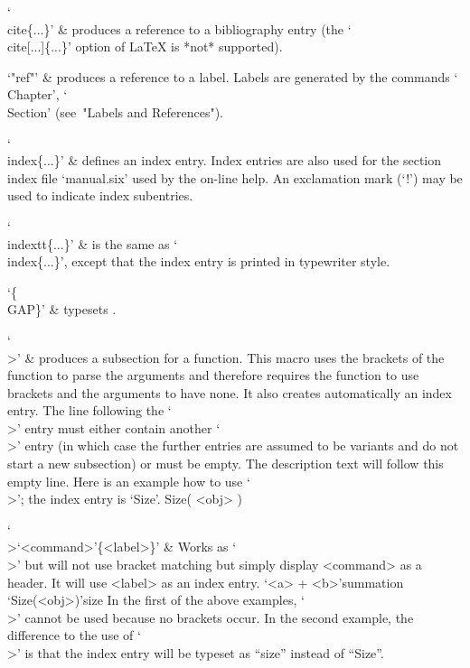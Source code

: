 `\\cite\{...\}' &
    produces  a     reference     to    a    bibliography   entry    (the
    `\\cite[...]\{...\}' option of La{\TeX} is *not* supported).

`"ref"' &
    produces a reference to a label.
    Labels are generated by the commands `\\Chapter', `\\Section'
    (see~"Labels and References").

`\\index\{...\}' &
    defines an index entry.  Index entries are  also used for the section
    index file `manual.six' used by the on-line help.
    An exclamation mark (`!') may be used to indicate index subentries.

`\\indextt\{...\}' &
    is the same as `\\index\{...\}', except that the index entry
    is printed in typewriter style.

`\{\\GAP\}' &
    typesets {\GAP}.

`\\>' &
    produces a subsection for a function.
    This macro uses the brackets of the function to parse the arguments
    and therefore requires the function to use brackets and the arguments
    to have none.
    It also creates automatically an index entry.
    The line following the `\\>' entry must either contain another `\\>'
    entry (in which case the further entries are assumed to be variants
    and do not start a new subsection) or must be empty.
    The description text will follow this empty line.
    Here is an example how to use `\\>'; the index entry is `Size'.
\begintt
\>Size( <obj> )
\endtt

`\\>{`<command>'}\{<label>\}' &
    Works as `\\>' but will not use bracket matching but simply display
    <command> as a header.
    It will use <label> as an index entry.
\begintt
\>`<a> + <b>'{summation}
\>`Size(<obj>)'{size}
\endtt
    In the first of the above examples, `\\>' cannot be used because
    no brackets occur.
    In the second example, the difference to the use of `\\>' is
    that the index entry will be typeset as ``size'' instead of ``Size''.

